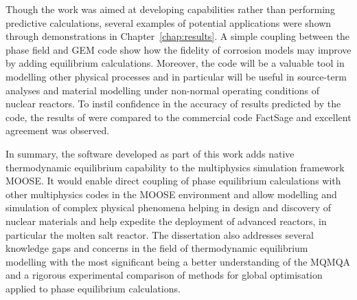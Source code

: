 	Though the work was aimed at developing capabilities rather than performing predictive calculations, several examples of potential applications were shown through demonstrations in Chapter~\ref{chap:results}. A simple coupling between the phase field and GEM code show how the fidelity of corrosion models may improve by adding equilibrium calculations. Moreover, the code will be a valuable tool in modelling other physical processes and in particular will be useful in source-term analyses and material modelling under non-normal operating conditions of nuclear reactors. To instil confidence in the accuracy of results predicted by the code, the results of {\GEM} were compared to the commercial code FactSage and excellent agreement was observed.
	
	In summary, the software developed as part of this work adds native thermodynamic equilibrium capability to the multiphysics simulation framework MOOSE. It would enable direct coupling of phase equilibrium calculations with other multiphysics codes in the MOOSE environment and allow modelling and simulation of complex physical phenomena helping in design and discovery of nuclear materials and help expedite the deployment of advanced reactors, in particular the molten salt reactor. The dissertation also addresses several knowledge gaps and concerns in the field of thermodynamic equilibrium modelling with the most significant being a better understanding of the MQMQA and a rigorous experimental comparison of methods for global optimisation applied to phase equilibrium calculations.
	
	
	